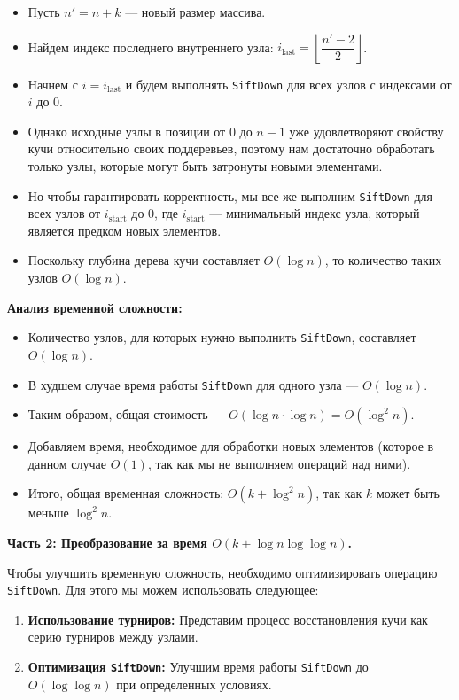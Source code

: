 \documentclass[11pt]{article}
\begin{document}
\begin{solution}
    \begin{itemize}
        \item Пусть $n' = n + k$ — новый размер массива.
        \item Найдем индекс последнего внутреннего узла: $i_{\text{last}} = \left\lfloor \dfrac{n' - 2}{2} \right\rfloor$.
        \item Начнем с $i = i_{\text{last}}$ и будем выполнять \texttt{SiftDown} для всех узлов с индексами от $i$ до $0$.
        \item Однако исходные узлы в позиции от $0$ до $n - 1$ уже удовлетворяют свойству кучи относительно своих поддеревьев, поэтому нам достаточно обработать только узлы, которые могут быть затронуты новыми элементами.
        \item Но чтобы гарантировать корректность, мы все же выполним \texttt{SiftDown} для всех узлов от $i_{\text{start}}$ до $0$, где $i_{\text{start}}$ — минимальный индекс узла, который является предком новых элементов.
        \item Поскольку глубина дерева кучи составляет $O(\log n)$, то количество таких узлов $O(\log n)$.
    \end{itemize}

    \textbf{Анализ временной сложности:}

    \begin{itemize}
        \item Количество узлов, для которых нужно выполнить \texttt{SiftDown}, составляет $O(\log n)$.
        \item В худшем случае время работы \texttt{SiftDown} для одного узла — $O(\log n)$.
        \item Таким образом, общая стоимость — $O(\log n \cdot \log n) = O(\log^2 n)$.
        \item Добавляем время, необходимое для обработки новых элементов (которое в данном случае $O(1)$, так как мы не выполняем операций над ними).
        \item Итого, общая временная сложность: $O(k + \log^2 n)$, так как $k$ может быть меньше $\log^2 n$.
    \end{itemize}

    \textbf{Часть 2: Преобразование за время $O(k + \log n \log \log n)$.}

    Чтобы улучшить временную сложность, необходимо оптимизировать операцию \texttt{SiftDown}. Для этого мы можем использовать следующее:

    \begin{enumerate}
        \item \textbf{Использование турниров:} Представим процесс восстановления кучи как серию турниров между узлами.
        \item \textbf{Оптимизация \texttt{SiftDown}:} Улучшим время работы \texttt{SiftDown} до $O(\log \log n)$ при определенных условиях.
    \end{enumerate}


\end{solution}
\end{document}
